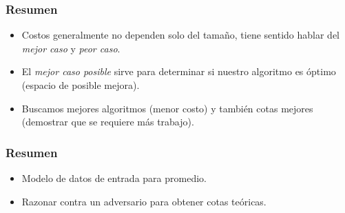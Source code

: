 \documentclass[english, spanish, fleqn,%
hyperref = {colorlinks, urlcolor = blue}%
]{beamer}
\begin{document}
\begin{frame}
  \setcounter{beamerpauses}{2}
  \frametitle{Resumen}

  \begin{itemize}
  \item
    Costos generalmente no dependen solo del tamaño,
    tiene sentido hablar del \emph{mejor caso} y \emph{peor caso}.
  \item
    El \emph{mejor caso posible}
    sirve para determinar si nuestro algoritmo es óptimo
    (espacio de posible mejora).
  \item
    Buscamos mejores algoritmos
    (menor costo)
    y también cotas mejores
    (demostrar que se requiere más trabajo).
  \end{itemize}
\end{frame}

\begin{frame}
  \setcounter{beamerpauses}{2}
  \frametitle{Resumen}

  \begin{itemize}
  \item
    Modelo de datos de entrada para promedio.
  \item
    Razonar contra un adversario para obtener cotas teóricas.
  \end{itemize}
\end{frame}
\end{document}
